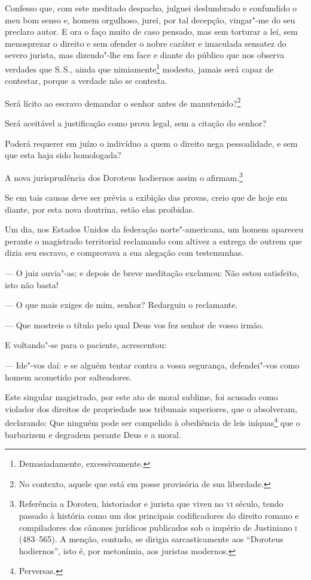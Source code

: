 Confesso que, com este meditado despacho, julguei deslumbrado e
confundido o meu bom senso e, homem orgulhoso, jurei, por tal decepção,
vingar"-me do seu preclaro autor. E ora o faço muito de caso pensado, mas
sem torturar a lei, sem menosprezar o direito e sem ofender o nobre
caráter e imaculada sensatez do severo jurista, mas dizendo"-lhe em face
e diante do público que nos observa verdades que S.\,S., ainda que
nimiamente\footnote{Demasiadamente, excessivamente.} modesto, jamais
será capaz de contestar, porque a verdade não se contesta.

Será lícito ao escravo demandar o senhor antes de manutenido?\footnote{
  No contexto, aquele que está em posse provisória de sua liberdade.}

Será aceitável a justificação como prova legal, sem a citação do senhor?

Poderá requerer em juízo o indivíduo a quem o direito nega pessoalidade,
e sem que esta haja sido homologada?

A nova jurisprudência dos Doroteus hodiernos assim o afirmam.\footnote{
  Referência a Doroteu, historiador e jurista que viveu no \textsc{vi} século,
  tendo passado à história como um dos principais codificadores do
  direito romano e compiladores dos cânones jurídicos publicados sob o
  império de Justiniano \textsc{i} (483--565). A menção, contudo, se dirigia
  sarcasticamente aos ``Doroteus hodiernos'', isto é, por metonímia, aos
  juristas modernos.}

Se em tais causas deve ser prévia a exibição das provas, creio que de
hoje em diante, por esta nova doutrina, estão elas proibidas.

Um dia, nos Estados Unidos da federação norte"-americana, um homem
apareceu perante o magistrado territorial reclamando com altivez a
entrega de outrem que dizia seu escravo, e comprovava a sua alegação com
testemunhas.

--- O juiz ouvia"-as; e depois de breve meditação exclamou: Não estou
satisfeito, isto não basta!

--- O que mais exiges de mim, senhor? Redarguiu o reclamante.

--- Que mostreis o título pelo qual Deus vos fez senhor de vosso irmão.

E voltando"-se para o paciente, acrescentou:

--- Ide"-vos daí: e se alguém tentar contra a vossa segurança,
defendei"-vos como homem acometido por salteadores.

Este singular magistrado, por este ato de moral sublime, foi acusado
como violador dos direitos de propriedade nos tribunais superiores, que
o absolveram, declarando: Que ninguém pode ser compelido à obediência de
leis iníquas\footnote{Perversas.} que o barbarizem e degradem perante
Deus e a moral.

